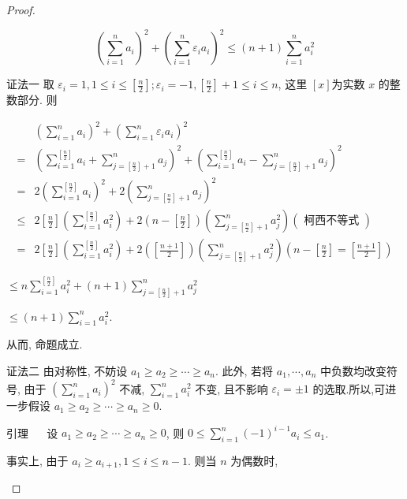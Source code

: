 \begin{proof}
\begin{example}
\begin{example}
	$$
	\left(\sum_{i=1}^{n} a_{i}\right)^{2}+\left(\sum_{i=1}^{n} \varepsilon_{i} a_{i}\right)^{2} \leqslant(n+1) \sum_{i=1}^{n} a_{i}^{2}
	$$
	
	证法一 取 $\varepsilon_{i}=1,1 \leqslant i \leqslant\left[\frac{n}{2}\right] ; \varepsilon_{i}=-1,\left[\frac{n}{2}\right]+1 \leqslant i \leqslant n$, 这里 $[x]$为实数 $x$ 的整数部分. 则
	
	$$
	\begin{aligned}
	& \left(\sum_{i=1}^{n} a_{i}\right)^{2}+\left(\sum_{i=1}^{n} \varepsilon_{i} a_{i}\right)^{2} \\
	= & \left(\sum_{i=1}^{\left[\frac{n}{2}\right]} a_{i}+\sum_{j=\left[\frac{n}{2}\right]+1}^{n} a_{j}\right)^{2}+\left(\sum_{i=1}^{\left[\frac{n}{2}\right]} a_{i}-\sum_{j=\left[\frac{n}{2}\right]+1}^{n} a_{j}\right)^{2} \\
	= & 2\left(\sum_{i=1}^{\left[\frac{n}{2}\right]} a_{i}\right)^{2}+2\left(\sum_{j=\left[\frac{n}{2}\right]+1}^{n} a_{j}\right)^{2} \\
	\leqslant & 2\left[\frac{n}{2}\right]\left(\sum_{i=1}^{\left[\frac{n}{2}\right]} a_{i}^{2}\right)+2\left(n-\left[\frac{n}{2}\right]\right)\left(\sum_{j=\left[\frac{n}{2}\right]+1}^{n} a_{j}^{2}\right)(\text { 柯西不等式 }) \\
	= & 2\left[\frac{n}{2}\right]\left(\sum_{i=1}^{\left[\frac{n}{2}\right]} a_{i}^{2}\right)+2\left(\left[\frac{n+1}{2}\right]\right)\left(\sum_{j=\left[\frac{n}{2}\right]+1}^{n} a_{j}^{2}\right)\left(n-\left[\frac{n}{2}\right]=\left[\frac{n+1}{2}\right]\right)
	\end{aligned}
	$$
	
	$\leqslant n \sum_{i=1}^{\left[\frac{n}{2}\right]} a_{i}^{2}+(n+1) \sum_{j=\left[\frac{n}{2}\right]+1}^{n} a_{j}^{2}$
	
	$\leqslant(n+1) \sum_{i=1}^{n} a_{i}^{2}$.
	
	从而, 命题成立.
	
	证法二 由对称性, 不妨设 $a_{1} \geqslant a_{2} \geqslant \cdots \geqslant a_{n}$. 此外, 若将 $a_{1}, \cdots, a_{n}$ 中负数均改变符号, 由于 $\left(\sum_{i=1}^{n} a_{i}\right)^{2}$ 不减, $\sum_{i=1}^{n} a_{i}^{2}$ 不变, 且不影响 $\varepsilon_{i}= \pm 1$ 的选取.所以,可进一步假设 $a_{1} \geqslant a_{2} \geqslant \cdots \geqslant a_{n} \geqslant 0$.
	
	引理 $\quad$ 设 $a_{1} \geqslant a_{2} \geqslant \cdots \geqslant a_{n} \geqslant 0$, 则 $0 \leqslant \sum_{i=1}^{n}(-1)^{i-1} a_{i} \leqslant a_{1}$.
	
	事实上, 由于 $a_{i} \geqslant a_{i+1}, 1 \leqslant i \leqslant n-1$. 则当 $n$ 为偶数时,
	

\end{example}
\end{example}
\end{proof}
